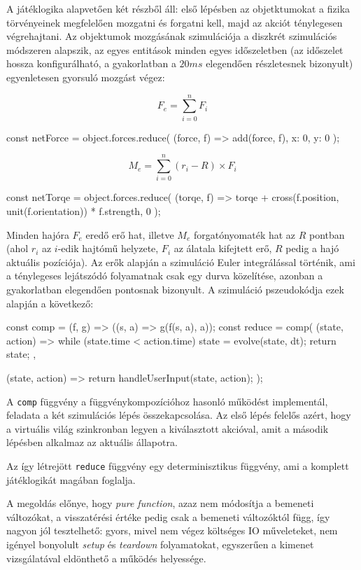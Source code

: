 \documentclass[12pt]{article}
\begin{document}
A játéklogika alapvetően két részből áll: első lépésben az objetktumokat a fizika
törvényeinek megfelelően mozgatni és forgatni kell, majd az akciót ténylegesen végrehajtani.
Az objektumok mozgásának szimulációja a diszkrét szimulációs módszeren alapszik,
az egyes entitások minden egyes időszeletben (az időszelet hossza konfigurálható,
a gyakorlatban a $20ms$ elegendően részletesnek bizonyult) egyenletesen gyorsuló
mozgást végez:

\[
  F_e = \sum_{i=0}^nF_i
\]

\begin{js}
  const netForce = object.forces.reduce(
    (force, f) => add(force, f),
    { x: 0, y: 0 }
  );
\end{js}

\[
  M_e = \sum_{i=0}^n(r_i - R) \times F_i
\]

\begin{js}
  const netTorqe = object.forces.reduce(
    (torqe, f) => torqe + cross(f.position, unit(f.orientation)) * f.strength,
    0
  );
\end{js}

Minden hajóra $F_e$ eredő erő hat, illetve $M_e$ forgatónyomaték hat az $R$ pontban
(ahol $r_i$ az $i$-edik hajtómű helyzete, $F_i$ az álatala kifejtett erő, $R$ pedig a hajó aktuális pozíciója).
Az erők alapján a szimuláció Euler integrálással történik, ami a ténylegeses lejátszódó
folyamatnak csak egy durva közelítése, azonban a gyakorlatban elegendően pontosnak bizonyult.
A szimuláció pszeudokódja ezek alapján a következő:

\begin{js}
  const comp = (f, g) => ((s, a) => g(f(s, a), a));
  const reduce = comp(
    (state, action) => {
      while (state.time < action.time) {
        state = evolve(state, dt);
      }
      return state;
    },

    (state, action) => {
      return handleUserInput(state, action);
    }
  );
\end{js}

A \texttt{comp} függvény a függvénykompozícióhoz hasonló működést implementál,
feladata a két szimulációs lépés összekapcsolása. Az első lépés felelős azért,
hogy a virtuális világ szinkronban legyen a kiválasztott akcióval, amit a második
lépésben alkalmaz az aktuális állapotra.

Az így létrejött \texttt{reduce} függvény egy determinisztikus függvény,
ami a komplett játéklogikát magában foglalja.

A megoldás előnye, hogy \emph{pure function}, azaz nem módosítja a bemeneti
változókat, a visszatérési értéke pedig csak a bemeneti változóktól függ,
így nagyon jól tesztelhető: gyors, mivel nem végez költséges IO műveleteket,
nem igényel bonyolult \emph{setup} és \emph{teardown} folyamatokat, egyszerűen
a kimenet vizsgálatával eldönthető a működés helyessége.
\end{document}
